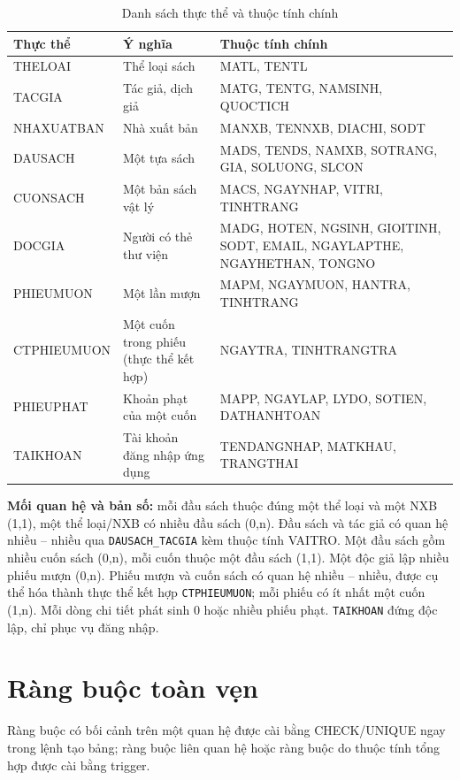 \documentclass[a4paper,oneside]{report}
\begin{document}
\begin{table}[!htbp]
\centering\small
\caption{Danh sách thực thể và thuộc tính chính}
\label{tab:thucthe}
\begin{tabularx}{\linewidth}{|p{3.1cm}|L|p{5.3cm}|}
\hline
\textbf{Thực thể} & \textbf{Ý nghĩa} & \textbf{Thuộc tính chính}\\\hline
THELOAI & Thể loại sách & MATL, TENTL\\\hline
TACGIA & Tác giả, dịch giả & MATG, TENTG, NAMSINH, QUOCTICH\\\hline
NHAXUATBAN & Nhà xuất bản & MANXB, TENNXB, DIACHI, SODT\\\hline
DAUSACH & Một tựa sách & MADS, TENDS, NAMXB, SOTRANG, GIA, SOLUONG, SLCON\\\hline
CUONSACH & Một bản sách vật lý & MACS, NGAYNHAP, VITRI, TINHTRANG\\\hline
DOCGIA & Người có thẻ thư viện & MADG, HOTEN, NGSINH, GIOITINH, SODT, EMAIL, NGAYLAPTHE, NGAYHETHAN, TONGNO\\\hline
PHIEUMUON & Một lần mượn & MAPM, NGAYMUON, HANTRA, TINHTRANG\\\hline
CTPHIEUMUON & Một cuốn trong phiếu (thực thể kết hợp) & NGAYTRA, TINHTRANGTRA\\\hline
PHIEUPHAT & Khoản phạt của một cuốn & MAPP, NGAYLAP, LYDO, SOTIEN, DATHANHTOAN\\\hline
TAIKHOAN & Tài khoản đăng nhập ứng dụng & TENDANGNHAP, MATKHAU, TRANGTHAI\\\hline
\end{tabularx}
\end{table}

\textbf{Mối quan hệ và bản số:} mỗi đầu sách thuộc đúng một thể loại và một NXB (1,1), một thể loại/NXB có nhiều đầu sách (0,n). Đầu sách và tác giả có quan hệ nhiều – nhiều qua \texttt{DAUSACH\_TACGIA} kèm thuộc tính VAITRO. Một đầu sách gồm nhiều cuốn sách (0,n), mỗi cuốn thuộc một đầu sách (1,1). Một độc giả lập nhiều phiếu mượn (0,n). Phiếu mượn và cuốn sách có quan hệ nhiều – nhiều, được cụ thể hóa thành thực thể kết hợp \texttt{CTPHIEUMUON}; mỗi phiếu có ít nhất một cuốn (1,n). Mỗi dòng chi tiết phát sinh 0 hoặc nhiều phiếu phạt. \texttt{TAIKHOAN} đứng độc lập, chỉ phục vụ đăng nhập.

\section{Ràng buộc toàn vẹn}
Ràng buộc có bối cảnh trên một quan hệ được cài bằng CHECK/UNIQUE ngay trong lệnh tạo bảng; ràng buộc liên quan hệ hoặc ràng buộc do thuộc tính tổng hợp được cài bằng trigger.
\end{document}
